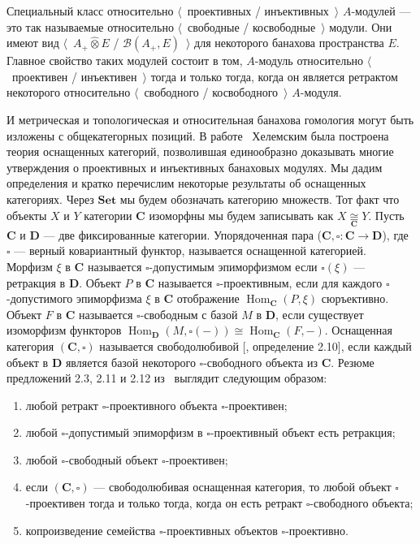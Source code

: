 \documentclass[12pt]{article}
\newcommand{\projtens}{\mathbin{\widehat{\otimes}}}
\newcommand{\isom}[1]{\mathop{\mathbin{\cong}}\limits_{#1}}
\begin{document}
Специальный класс относительно $\langle$~проективных / инъективных~$\rangle$
$A$-модулей --- это так называемые относительно $\langle$~свободные /
косвободные~$\rangle$ модули. Они имеют вид $\langle$~$A_+\projtens E$ /
$\mathcal{B}(A_+,E)$~$\rangle$ для некоторого банахова пространства $E$. Главное
свойство таких модулей состоит в том, $A$-модуль относительно
$\langle$~проективен / инъективен~$\rangle$ тогда и только тогда, когда он
является ретрактом некоторого относительно $\langle$~свободного /
косвободного~$\rangle$ $A$-модуля.

И метрическая и топологическая и относительная банахова гомология могут быть
изложены с общекатегорных позиций. В работе~\cite{HelMetrFrQMod} Хелемским была
построена теория оснащенных категорий, позволившая единообразно доказывать
многие утверждения о проективных и инъективных банаховых модулях. Мы дадим
определения и кратко перечислим некоторые результаты об оснащенных категориях.
Через $\mathbf{Set}$ мы будем обозначать категорию множеств. Тот факт что
объекты $X$ и $Y$ категории $\mathbf{C}$ изоморфны мы будем записывать как
$X\isom{\mathbf{C}}Y$. Пусть $\mathbf{C}$ и $\mathbf{D}$ --- две фиксированные
категории. Упорядоченная пара ($\mathbf{C}, \square:\mathbf{C}\to\mathbf{D}$),
где $\square$ --- верный ковариантный функтор, называется оснащенной категорией.
Морфизм $\xi$ в $\mathbf{C}$ называется $\square$-допустимым эпиморфизмом если
$\square (\xi)$ --- ретракция в $\mathbf{D}$. Объект $P$ в $\mathbf{C}$
называется $\square$-проективным, если для каждого $\square$-допустимого
эпиморфизма $\xi$ в $\mathbf{C}$ отображение
$\operatorname{Hom}_{\mathbf{C}}(P,\xi)$ сюръективно. Объект $F$ в $\mathbf{C}$
называется $\square$-свободным с базой $M$ в  $\mathbf{D}$, если существует
изоморфизм функторов
$\operatorname{Hom}_{\mathbf{D}}(M,\square(-))
    \cong\operatorname{Hom}_{\mathbf{C}}(F,-)$.
Оснащенная категория $(\mathbf{C},\square)$ называется свободолюбивой
[\cite{HelMetrFrQMod}, определение 2.10], если каждый объект в $\mathbf{D}$
является базой некоторого $\square$-свободного объекта из $\mathbf{C}$. Резюме
предложений 2.3, 2.11  и 2.12 из~\cite{HelMetrFrQMod} выглядит следующим
образом:
\begin{enumerate}[label = (\roman*)]
    \item любой ретракт $\square$-проективного объекта $\square$-проективен;

    \item любой $\square$-допустимый эпиморфизм в $\square$-проективный 
          объект есть ретракция;

    \item любой $\square$-свободный объект $\square$-проективен;

    \item если $(\mathbf{C},\square)$ --- свободолюбивая оснащенная категория, 
          то любой объект $\square$-проективен тогда и только тогда, 
          когда он есть ретракт $\square$-свободного объекта;

    \item копроизведение семейства $\square$-проективных объектов
          $\square$-проективно.
\end{enumerate}
\end{document}
